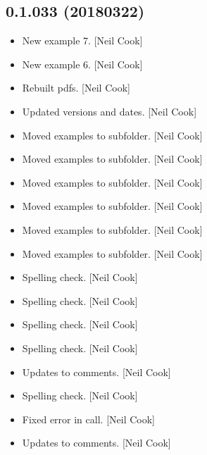 \documentclass[a4paper,10pt,english]{report}
\begin{document}
\subsection{0.1.033 (2018\sphinxhyphen{}03\sphinxhyphen{}22)}
\label{\detokenize{misc/changelog:id489}}\begin{itemize}
\item {} 
New example 7. {[}Neil Cook{]}

\item {} 
New example 6. {[}Neil Cook{]}

\item {} 
Rebuilt pdfs. {[}Neil Cook{]}

\item {} 
Updated versions and dates. {[}Neil Cook{]}

\item {} 
Moved examples to subfolder. {[}Neil Cook{]}

\item {} 
Moved examples to subfolder. {[}Neil Cook{]}

\item {} 
Moved examples to subfolder. {[}Neil Cook{]}

\item {} 
Moved examples to subfolder. {[}Neil Cook{]}

\item {} 
Moved examples to subfolder. {[}Neil Cook{]}

\item {} 
Moved examples to subfolder. {[}Neil Cook{]}

\item {} 
Spelling check. {[}Neil Cook{]}

\item {} 
Spelling check. {[}Neil Cook{]}

\item {} 
Spelling check. {[}Neil Cook{]}

\item {} 
Spelling check. {[}Neil Cook{]}

\item {} 
Updates to comments. {[}Neil Cook{]}

\item {} 
Spelling check. {[}Neil Cook{]}

\item {} 
Fixed error in call. {[}Neil Cook{]}

\item {} 
Updates to comments. {[}Neil Cook{]}


\end{itemize}
\end{document}
